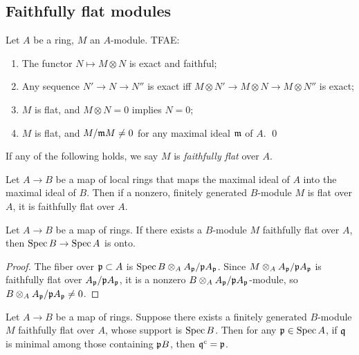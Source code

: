 \documentclass[11pt]{amsart}
\begin{document}
\subsection{Faithfully flat modules}


\begin{prop}
    Let $A$ be a ring, $M$ an $A$-module. TFAE:
    \begin{enumerate}
        \item The functor $N\mapsto M\otimes N$ is exact and faithful;
        \item Any sequence $N'\to N\to N''$ is exact iff $M\otimes N' \to M\otimes N \to M\otimes N''$ is exact;
        \item $M$ is flat, and $M\otimes N = 0$ implies $N = 0$;
        \item $M$ is flat, and $M/\mathfrak{m} M\neq 0$ for any maximal ideal $\mathfrak{m}$ of $A$. \qed
    \end{enumerate}
\end{prop}

If any of the following holds, we say $M$ is \emph{faithfully flat} over $A$.


\begin{cor}
\label{cor1.2.2}
    Let $A\to B$ be a map of local rings that maps the maximal ideal of $A$ into the maximal ideal of $B$. Then if a nonzero, finitely generated $B$-module $M$ is flat over $A$, it is faithfully flat over $A$.
\end{cor}


\begin{prop}
\label{prop1.2.3}
    Let $A\to B$ be a map of rings. If there exists a $B$-module $M$ faithfully flat over $A$, then $\operatorname{Spec} B\to \operatorname{Spec} A$ is onto.
\end{prop}

\begin{proof}
    The fiber over $\mathfrak{p}\subset A$ is $\operatorname{Spec} B\otimes_A A_{\mathfrak{p}}/\mathfrak{p} A_{\mathfrak{p}}$. Since $M\otimes_A A_{\mathfrak{p}}/\mathfrak{p} A_{\mathfrak{p}}$ is faithfully flat over $A_{\mathfrak{p}}/\mathfrak{p} A_{\mathfrak{p}}$, it is a nonzero $B\otimes_A A_{\mathfrak{p}}/\mathfrak{p} A_{\mathfrak{p}}$-module, so $B\otimes_A A_{\mathfrak{p}}/\mathfrak{p} A_{\mathfrak{p}} \neq 0$.
\end{proof}



\begin{cor}
    Let $A\to B$ be a map of rings. Suppose there exists a finitely generated $B$-module $M$ faithfully flat over $A$, whose support is $\operatorname{Spec} B$. Then for any $\mathfrak{p}\in \operatorname{Spec} A$, if $\mathfrak{q}$ is minimal among those containing $\mathfrak{p} B$, then $\mathfrak{q}^c = \mathfrak{p}$.
\end{cor}
\end{document}
